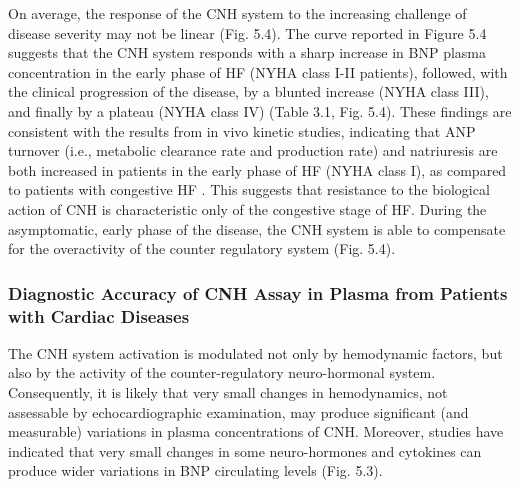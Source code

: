 \documentclass[14pt,a4paper,onecolumn]{extarticle}
\begin{document}
On average, the response of the CNH system to the increasing challenge of disease severity may not be linear (Fig. 5.4). The curve reported in Figure 5.4 suggests that the CNH system responds with a sharp increase in BNP plasma concentration in the early phase of HF (NYHA class I-II patients), followed, with the clinical progression of the disease, by a blunted increase (NYHA class III), and finally by a plateau (NYHA class IV) (Table 3.1, Fig. 5.4). These findings are consistent with the results from in vivo kinetic studies, indicating that ANP turnover (i.e., metabolic clearance rate and production rate) and natriuresis are both increased in patients in the early phase of HF (NYHA class I), as compared to patients with congestive HF \citep{bib324} \citep{bib326}. This suggests that resistance to the biological action of CNH is characteristic only of the congestive stage of HF. During the asymptomatic, early phase of the disease, the CNH system is able to compensate for the overactivity of the counter regulatory system (Fig. 5.4).


\subsubsection{ Diagnostic Accuracy of CNH Assay in Plasma from Patients with Cardiac Diseases}

The CNH system activation is modulated not only by hemodynamic factors, but also by the activity of the counter-regulatory neuro-hormonal system.%
Consequently, it is likely that very small changes in hemodynamics, not assessable by echocardiographic examination, may produce significant (and measurable) variations in plasma concentrations of CNH. Moreover, studies have indicated that very small changes in some neuro-hormones and cytokines can produce wider variations in BNP circulating levels \citep{bib360} (Fig. 5.3).
\end{document}
